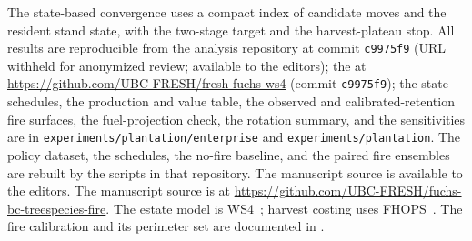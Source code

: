 The state-based convergence uses a compact index of candidate moves and the resident stand state,
with the two-stage target and the harvest-plateau stop. All results are reproducible from the analysis
repository
\ifreview
at commit \texttt{c9975f9} (URL withheld for anonymized review; available to the editors); the
\else
at \url{https://github.com/UBC-FRESH/fresh-fuchs-ws4} (commit \texttt{c9975f9}); the
\fi
state schedules, the production and value table, the observed and calibrated-retention fire surfaces,
the fuel-projection check, the rotation summary, and the sensitivities are in
\texttt{experiments/plantation/enterprise} and \texttt{experiments/plantation}. The policy dataset,
the schedules, the no-fire baseline, and the paired fire ensembles are rebuilt by the scripts in that
repository.
\ifreview
The manuscript source is available to the editors.
\else
The manuscript source is at
\url{https://github.com/UBC-FRESH/fuchs-bc-treespecies-fire}.
\fi
The estate model is WS4~\citep{ubc_fresh_ws4_2026}; harvest costing uses
FHOPS~\citep{fhops_2026}. The fire calibration and its perimeter set are documented in
\citet{ubc_fresh_fire_calibration_2026}.
